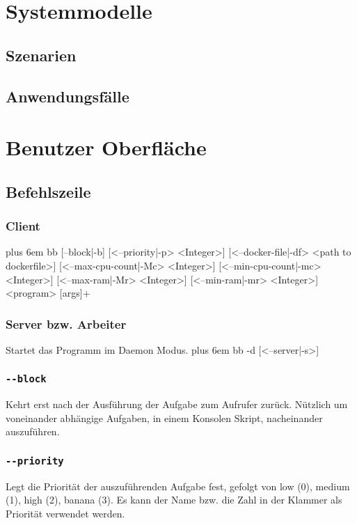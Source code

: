 \documentclass[a4paper,12pt]{article}
\makeatletter
\newenvironment{mycode}
 {\def\@xobeysp{\ }\verbatim\rightskip=0pt plus 6em\relax}
 {\endverbatim}
\makeatother
\begin{document}


\section{Systemmodelle}

\subsection{Szenarien}

\subsection{Anwendungsfälle}

\section{Benutzer Oberfläche}
\subsection{Befehlszeile}
\subsubsection{Client}
\begin{mycode}
bb [--block|-b] [<--priority|-p> <Integer>] [<--docker-file|-df> <path to dockerfile>] [<--max-cpu-count|-Mc> <Integer>] [<--min-cpu-count|-mc> <Integer>] [<--max-ram|-Mr> <Integer>] [<--min-ram|-mr> <Integer>] <program> [args]+
\end{mycode}

\subsubsection{Server bzw. Arbeiter}
Startet das Programm im \gls{Daemon} Modus.
\begin{mycode}
bb -d [<--server|-s>]
\end{mycode}

\subsubsection{\texttt{-{}-block}}
Kehrt erst nach der Ausführung der Aufgabe zum Aufrufer zurück. Nützlich um voneinander abhängige Aufgaben, in einem Konsolen Skript, nacheinander auszuführen.

\subsubsection{\texttt{-{}-priority}}
Legt die Priorität der auszuführenden Aufgabe fest, gefolgt von low (0), medium (1), high (2), banana (3).
Es kann der Name bzw. die Zahl in der Klammer als Priorität verwendet werden.
\end{document}
